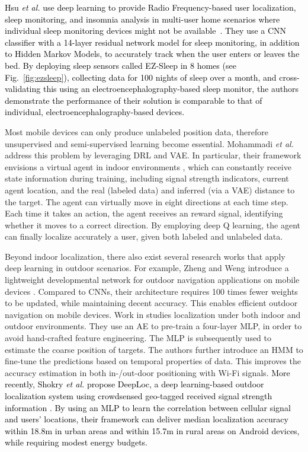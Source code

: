 \documentclass[journal,comsoc,letter]{IEEEtran}
\newcommand{\rev}[1]{\textcolor{black}{#1}}
\begin{document}
\rev{Hsu \emph{et al.} use deep learning to provide Radio Frequency-based user localization, sleep monitoring, and insomnia analysis in multi-user home scenarios where individual sleep monitoring devices might not be available~\cite{Hsu:2017:ZIS:3139486.3130924}. They use a CNN classifier with a 14-layer residual network model for sleep monitoring, in addition to Hidden Markov Models, to accurately track when the user enters or leaves the bed. By deploying sleep sensors called EZ-Sleep in 8 homes (see Fig.~\ref{fig:ezsleep}), collecting data for 100 nights of sleep over a month, and cross-validating this using an electroencephalography-based sleep monitor, the authors demonstrate the performance of their solution is comparable to that of individual, electroencephalography-based devices. }


Most mobile devices can only produce unlabeled position data, therefore unsupervised and semi-supervised learning become essential. Mohammadi \emph{et al.} address this problem by leveraging DRL and VAE. In particular, their framework envisions a virtual agent in indoor environments \cite{mohammadi2017semi}, which can constantly receive state information during training, including signal strength indicators, current agent location, and the real (labeled data) and inferred (via a VAE) distance to the target. The agent can virtually move in eight directions at each time step. Each time it takes an action, the agent receives an reward signal, identifying whether it moves to a correct direction. By employing deep Q learning, the agent can finally localize accurately a user, given both labeled and unlabeled data. 

Beyond indoor localization, there also exist several research works that apply deep learning in outdoor scenarios. For example, Zheng and Weng introduce a lightweight developmental network for outdoor navigation applications on mobile devices \cite{zhengj2016mobile}. Compared to CNNs, their architecture requires 100 times fewer weights to be updated, while maintaining decent accuracy. This enables efficient outdoor navigation on mobile devices. Work in \cite{zhang2016deep3} studies localization under both indoor and outdoor environments. They use an AE to pre-train a four-layer MLP, in order to avoid hand-crafted feature engineering. The MLP is subsequently used to estimate the coarse position of targets. The authors further introduce an HMM to fine-tune the predictions based on temporal properties of data. This improves the accuracy  estimation in both in-/out-door positioning with Wi-Fi signals. \rev{More recently, Shokry \emph{et al.} propose DeepLoc, a deep learning-based outdoor localization system using crowdsensed geo-tagged received signal strength information \cite{shokry2018deeploc}. By using an MLP to learn the correlation between cellular signal and users' locations, their framework can deliver median localization accuracy within 18.8m in urban areas and within 15.7m in rural areas on Android devices, while requiring modest energy budgets.}\\
\end{document}
